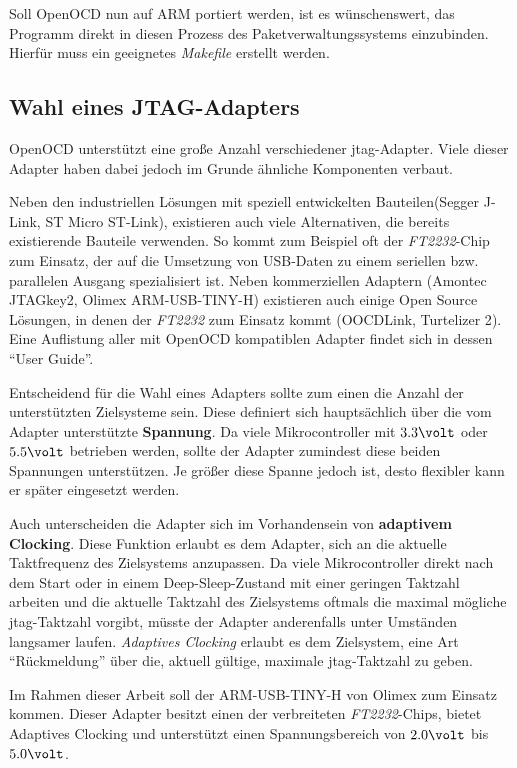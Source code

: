 Soll OpenOCD nun auf ARM portiert werden, ist es wünschenswert, das Programm
direkt in diesen Prozess des Paketverwaltungssystems einzubinden. Hierfür muss
ein geeignetes \emph{Makefile} erstellt werden.

\subsection{Wahl eines JTAG-Adapters}
OpenOCD unterstützt eine große Anzahl verschiedener \gls{jtag}-Adapter.
Viele dieser Adapter haben dabei jedoch im Grunde ähnliche Komponenten verbaut.

Neben den industriellen Lösungen mit speziell entwickelten Bauteilen(Segger
J-Link\cite{SEG}, ST Micro ST-Link\cite{STM01}), existieren auch viele
Alternativen, die bereits existierende Bauteile verwenden. So kommt zum Beispiel oft der
\emph{FT2232}-Chip zum Einsatz, der auf die Umsetzung von USB-Daten zu einem
seriellen bzw. parallelen Ausgang spezialisiert ist. Neben kommerziellen
Adaptern (Amontec JTAGkey2\cite{AMO}, Olimex ARM-USB-TINY-H\cite{OLI})
existieren auch einige Open Source Lösungen, in denen der \emph{FT2232} zum
Einsatz kommt (OOCDLink\cite{OCDL}, Turtelizer 2\cite{TURT}). Eine Auflistung
aller mit OpenOCD kompatiblen Adapter findet sich in dessen "`User Guide"'\cite{OOCD}.

Entscheidend für die Wahl eines Adapters sollte zum einen die Anzahl der
unterstützten Zielsysteme sein. Diese definiert sich hauptsächlich über die
vom Adapter unterstützte \textbf{Spannung}. Da viele Mikrocontroller mit
$3.3\volt$ oder $5.5\volt$ betrieben werden, sollte der Adapter zumindest diese beiden
Spannungen unterstützen. Je größer diese Spanne jedoch ist, desto flexibler kann
er später eingesetzt werden.

Auch unterscheiden die Adapter sich im Vorhandensein von \textbf{adaptivem
Clocking}. Diese Funktion erlaubt es dem Adapter, sich an die aktuelle
Taktfrequenz des Zielsystems anzupassen. Da viele Mikrocontroller direkt nach
dem Start oder in einem Deep-Sleep-Zustand mit einer geringen Taktzahl arbeiten
und die aktuelle Taktzahl des Zielsystems oftmals die maximal mögliche
\gls{jtag}-Taktzahl vorgibt, müsste der Adapter anderenfalls unter Umständen langsamer
laufen. \emph{Adaptives Clocking} erlaubt es dem Zielsystem, eine Art
"`Rückmeldung"' über die, aktuell gültige, maximale \gls{jtag}-Taktzahl zu geben.

Im Rahmen dieser Arbeit soll der ARM-USB-TINY-H von Olimex zum Einsatz kommen.
Dieser Adapter besitzt einen der verbreiteten \emph{FT2232}-Chips, bietet
Adaptives Clocking und unterstützt einen Spannungsbereich von $2.0\volt$ bis
$5.0\volt$.

